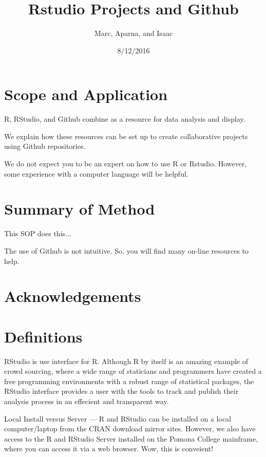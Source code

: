 \documentclass[12pt]{../SOP3_beta}
\author{Marc, Aparna, and Isaac}
\title{Rstudio Projects and Github}
\date{8/12/2016}
\begin{document}

\maketitle

\section{Scope and Application}

\NP R, RStudio, and Github combine as a resource for data analysis and display.

\NP We explain how these resources can be set up to create collaborative projects using Github repositories. 

\NP We do not expect you to be an expert on how to use R or Rstudio. However, some experience with a computer language will be helpful. 

\section{Summary of Method}

\NP This SOP does this...


\NP The use of Github is not intuitive. So, you will find many on-line resources to help.

\tableofcontents

\newpage

\section{Acknowledgements}

\section{Definitions}

\NP RStudio is use interface for R. Although R by itself is an amazing example of crowd sourcing, where a wide range of staticians and programmers have created a free programming environments with a robust range of statistical packages, the RStudio interface provides a user with the tools to track and publish their analysis process in an effecient and transparent way. 

\NP Local Install versus Server --- R and RStudio can be installed on a local computer/laptop from the CRAN download mirror sites. However, we also have access to the R and RStudio Server installed on the Pomona College mainframe, where you can access it via a web browser. Wow, this is conveient!
\end{document}
